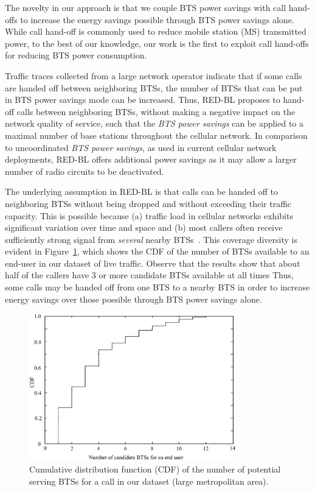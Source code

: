The novelty in our approach is that we couple BTS power savings with call hand-offs to increase the
energy savings possible through BTS power savings alone. While call hand-off is commonly used to
reduce mobile station (MS) transmitted power, to the best of our knowledge, our work is the first to exploit call hand-offs for reducing BTS power consumption.

Traffic traces collected from a large network operator indicate that if some calls are handed off between
neighboring BTSs, the number of BTSs that can be put in BTS power savings mode can be increased.
Thus, RED-BL proposes to hand-off calls between neighboring BTSs, without making a negative
impact on the network quality of service, such that the \textit{BTS power savings} can be applied to a
maximal number of base stations throughout the cellular network. In comparison to uncoordinated \textit{BTS power savings}, as used in current cellular network deployments, RED-BL
offers additional power savings as it may allow a larger number of radio circuits to be deactivated.

The underlying assumption in RED-BL is that calls can be handed off to neighboring BTSs
without being dropped and without exceeding their traffic capacity. This is possible because (a) traffic load in cellular networks exhibits significant variation over time and space and (b)
most callers often receive sufficiently strong signal from \emph{several} nearby
BTSs~\cite{Peng:2011:BTSSaving:Mobicom,lowcarb:2013:globecom}.
This coverage diversity is evident in Figure~\ref{fig:btscdf}, which shows the CDF of the number of BTSs available to an end-user in our dataset of live traffic.
Observe that the results show that about half of the callers have 3 or more candidate BTSs available at all times
Thus, some calls may be handed off from one BTS to a nearby BTS in order to increase energy savings over those
possible through BTS power savings alone.
\begin{figure}[h!]
\centering
\includegraphics[width=0.8\textwidth]{pics/ilyas2.eps}
\caption{Cumulative distribution function (CDF) of the number of potential serving BTSs for a call in our dataset (large metropolitan area).}
\label{fig:btscdf}
\end{figure}

